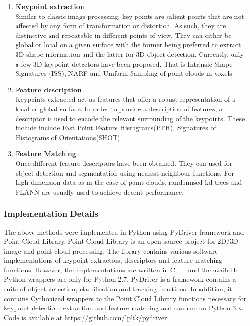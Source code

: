 \begin{enumerate}
	\item \textbf{Keypoint extraction} \\ 
	Similar to classic image processing, key points are salient points that are not affected by any form of transformation or distortion. As such, they are distinctive and repeatable in different points-of-view.  They can either be global or local on a given surface with the former being preferred to extract 3D shape information and the latter for 3D object detection. 
	Currently, only a few 3D keypoint detectors have been proposed. That is Intrinsic Shape Signatures (ISS)\cite{zhong2009intrinsic}, NARF\cite{steder2010narf} and Uniform Sampling of point clouds in voxels.
	\item \textbf{Feature description} \\ 
	Keypoints extracted act as features that offer a robust representation of a local or global surface. In order to provide a description of features, a descriptor is used to encode the relevant surrounding of the keypoints. These include include Fast Point Feature Histograms(PFH)\cite{rusu2009fast}, Signatures of Histograms of Orientations(SHOT)\cite{salti2014shot}. 
	
	\item \textbf{Feature Matching} \\
	Once different feature descriptors have been obtained. They can used for object detection and segmentation using nearest-neighbour functions. For high dimension data as in the case of point-clouds, randomised kd-trees and FLANN are usually used to achieve decent performance. 
		
\end{enumerate}

\subsubsection{Implementation Details}
The above methods were implemented in Python using PyDriver\cite{thesisSTUDIENARBEITPlotkin} framework and Point Cloud Library. 
Point Cloud Library is an open-source project for 2D/3D image and point cloud processing. The library contains various software implementations of keypoint extractors, descriptors and feature matching functions. However, the implementations are written in C++ and the available Python wrappers are only for Python 2.7. 
PyDriver is a framework contains a suite of object detection, classification and tracking functions. In addition, it contains Cythonized wrappers to the Point Cloud Library functions necessary for keypoint detection, extraction and feature matching and can run on Python 3.x. Code is available at \url{https://github.com/lpltk/pydriver}


